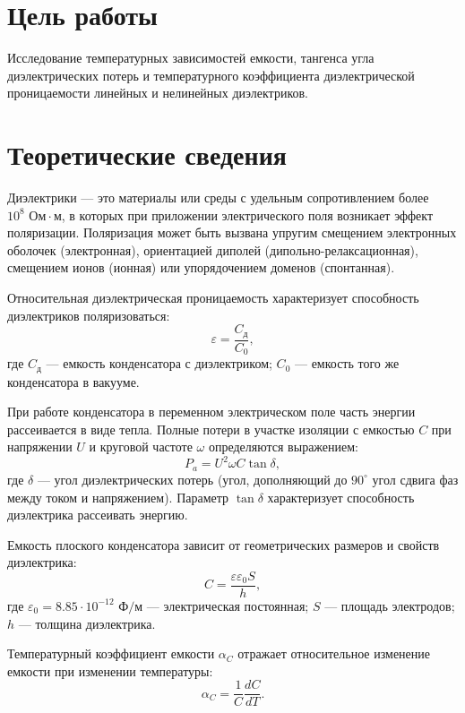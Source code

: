 \section*{Цель работы}
Исследование температурных зависимостей емкости, тангенса угла диэлектрических потерь и температурного коэффициента диэлектрической проницаемости линейных и нелинейных диэлектриков.

\section*{Теоретические сведения}
Диэлектрики --- это материалы или среды с удельным сопротивлением более $10^8 \text{ Ом}\cdot\text{м}$, в которых при приложении электрического поля возникает эффект поляризации. Поляризация может быть вызвана упругим смещением электронных оболочек (электронная), ориентацией диполей (дипольно-релаксационная), смещением ионов (ионная) или упорядочением доменов (спонтанная). 

Относительная диэлектрическая проницаемость характеризует способность диэлектриков поляризоваться:
\begin{equation}
    \varepsilon = \frac{C_{\text{д}}}{C_0},
\end{equation}
где $C_{\text{д}}$ --- емкость конденсатора с диэлектриком; $C_0$ --- емкость того же конденсатора в вакууме.

При работе конденсатора в переменном электрическом поле часть энергии рассеивается в виде тепла. Полные потери в участке изоляции с емкостью $C$ при напряжении $U$ и круговой частоте $\omega$ определяются выражением:
\begin{equation}
    P_a = U^2 \omega C \tan \delta,
\end{equation}
где $\delta$ --- угол диэлектрических потерь (угол, дополняющий до $90^\circ$ угол сдвига фаз между током и напряжением). Параметр $\tan \delta$ характеризует способность диэлектрика рассеивать энергию.

Емкость плоского конденсатора зависит от геометрических размеров и свойств диэлектрика:
\begin{equation}
    C = \frac{\varepsilon \varepsilon_0 S}{h},
\end{equation}
где $\varepsilon_0 = 8.85 \cdot 10^{-12} \text{ Ф/м}$ --- электрическая постоянная; $S$ --- площадь электродов; $h$ --- толщина диэлектрика.

Температурный коэффициент емкости $\alpha_C$ отражает относительное изменение емкости при изменении температуры:
\begin{equation}
    \alpha_C = \frac{1}{C} \frac{dC}{dT}.
    \label{form:alphac}
\end{equation}

